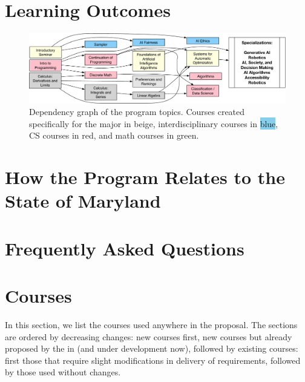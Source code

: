 \documentclass[
10pt, %
a4paper, %
oneside, %
headinclude,footinclude, %
BCOR5mm, %
]{scrartcl}
\begin{document}



\section{Learning Outcomes}



\begin{figure}

  \includegraphics[width=1.2\linewidth]{figures/dependency}
  \caption{Dependency graph of the program topics.  Courses created specifically for the \ai{} major in \colorbox{yellow!30}{beige}, interdisciplinary courses in \colorbox{SkyBlue}{blue}, CS courses in \colorbox{red!30}{red}, and math courses in \colorbox{green!30}{green}.}
\end{figure}




\section{How the Program Relates to the State of Maryland}



\section{Frequently Asked Questions}



  \section{Courses}

In this section, we list the courses used anywhere in the proposal.  The sections are ordered by decreasing changes: new courses first, new courses but already proposed by the  in  (and under development now), followed by existing courses: first those that require slight modifications in delivery of requirements, followed by those used without changes.  
\end{document}
